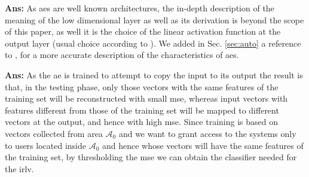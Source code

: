 \documentclass[draftcls,onecolumn,12pt]{IEEEtran}
\begin{document}
\vspace{5mm} %
\begin{framed}
\end{framed}

{\bf Ans:} As \acp{ae} are well known architectures, the in-depth description of the meaning of the low dimensional layer as well as its derivation is beyond the scope of this paper, as well it is the choice of the linear activation function at the output layer (usual choice according to \cite[Chapter 14]{Goodfellow}). We added in Sec. \ref{sec:auto} a reference to \cite[Chapter 14]{Goodfellow}, for a more accurate description of the characteristics of \acp{ae}.

\vspace{5mm} %
\begin{framed}
\end{framed}

{\bf Ans:} As the \ac{ae} is trained to attempt to copy the input to its output the result is that, in the testing phase, only those vectors with the same features of the training set will be reconstructed with small \ac{mse}, whereas input vectors with features different from those of the training set will be mapped to different vectors at the output, and hence with high \ac{mse}. Since training is based on vectors collected from area $\mathcal{A}_0$ and we want to grant access to the systems only to users located inside $\mathcal{A}_0$ and hence whose vectors will have the same features of the training set, by thresholding the \ac{mse} we can obtain the classifier needed for the \ac{irlv}.
\end{document}
